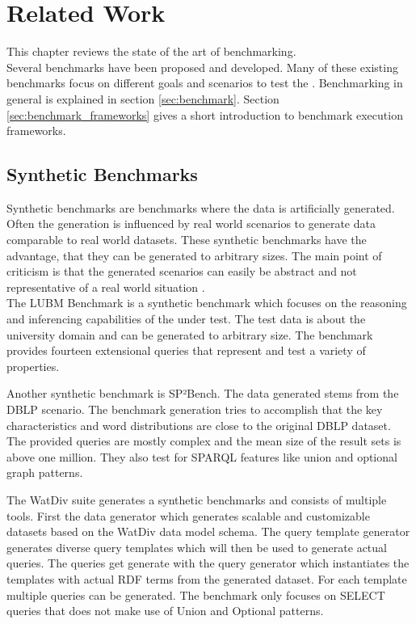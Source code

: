 \chapter{Related Work}
\label{ch:related_work}

This chapter reviews the state of the art of \ts{} benchmarking.\\

Several benchmarks have been proposed and developed.
Many of these existing benchmarks focus on different goals and scenarios to test the \tsp{}.
Benchmarking in general is explained in section \ref{sec:benchmark}.
Section \ref{sec:benchmark_frameworks} gives a short introduction to benchmark execution frameworks.

\section{Synthetic Benchmarks}
\label{sec:synthetic_benchmarks}
Synthetic benchmarks are benchmarks where the data is artificially generated.
Often the generation is influenced by real world scenarios to generate data comparable to real world datasets\cite{guoLUBMBenchmarkOWL2005}.
These synthetic benchmarks have the advantage, that they can be generated to arbitrary sizes.
The main point of criticism is that the generated scenarios can easily be abstract and not representative of a real world situation \cite{saleemFEASIBLEFeatureBasedSPARQL2015}.\\

The LUBM Benchmark\cite{guoLUBMBenchmarkOWL2005} is a synthetic benchmark which focuses on the reasoning and inferencing capabilities of the \tsp{} under test.
The test data is about the university domain and can be generated to arbitrary size.
The benchmark provides fourteen extensional queries that represent and test a variety of properties.

Another synthetic benchmark is SP²Bench\cite{schmidtSP2BenchSPARQLPerformance2008}.
The data generated stems from the DBLP scenario. The benchmark generation tries to accomplish that the key characteristics and word distributions are close to the original DBLP dataset.
The provided queries are mostly complex and the mean size of the result sets is above one million\cite{saleemFEASIBLEFeatureBasedSPARQL2015}.
They also test for SPARQL features like union and optional graph patterns.

The WatDiv suite generates a synthetic benchmarks and consists of multiple tools\cite{alucDiversifiedStressTesting2014}.
First the data generator which generates scalable and customizable datasets based on the WatDiv data model schema.
The query template generator generates diverse query templates which will then be used to generate actual queries.
The queries get generate with the query generator which instantiates the templates with actual RDF terms from the generated dataset.
For each template multiple queries can be generated.
The benchmark only focuses on SELECT queries that does not make use of Union and Optional patterns.

